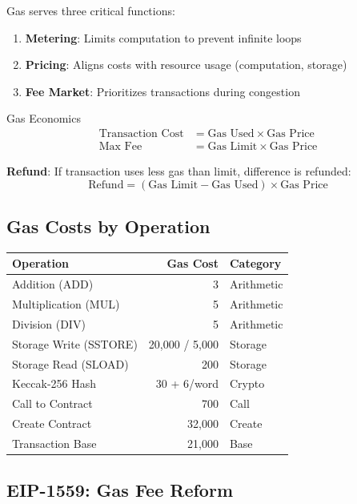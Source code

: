 \documentclass[11pt,a4paper]{article}
\begin{document}
Gas serves three critical functions:

\begin{enumerate}
  \item \textbf{Metering}: Limits computation to prevent infinite loops
  \item \textbf{Pricing}: Aligns costs with resource usage (computation, storage)
  \item \textbf{Fee Market}: Prioritizes transactions during congestion
\end{enumerate}

\begin{keybox}{Gas Economics}
\begin{align*}
\text{Transaction Cost} &= \text{Gas Used} \times \text{Gas Price} \\
\text{Max Fee} &= \text{Gas Limit} \times \text{Gas Price}
\end{align*}

\textbf{Refund}: If transaction uses less gas than limit, difference is refunded:
\[
\text{Refund} = (\text{Gas Limit} - \text{Gas Used}) \times \text{Gas Price}
\]
\end{keybox}

\subsection{Gas Costs by Operation}

\begin{center}
\begin{tabular}{|l|r|l|}
\hline
\textbf{Operation} & \textbf{Gas Cost} & \textbf{Category} \\
\hline
Addition (ADD) & 3 & Arithmetic \\
Multiplication (MUL) & 5 & Arithmetic \\
Division (DIV) & 5 & Arithmetic \\
Storage Write (SSTORE) & 20,000 / 5,000 & Storage \\
Storage Read (SLOAD) & 200 & Storage \\
Keccak-256 Hash & 30 + 6/word & Crypto \\
Call to Contract & 700 & Call \\
Create Contract & 32,000 & Create \\
Transaction Base & 21,000 & Base \\
\hline
\end{tabular}
\end{center}

\subsection{EIP-1559: Gas Fee Reform}
\end{document}
